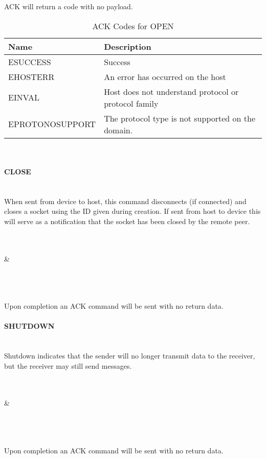 \documentclass[10pt]{article}
\begin{document}
	ACK will return a code with no payload.
	\begin{table}[H]
		\begin{center}
			\caption{ACK Codes for OPEN}
			\label{tab:openErrTable}
			\begin{tabular}{l|l} 
				\rowcolor{lightgray}
				\textbf{Name} & \textbf{Description}\\
				\hline
				ESUCCESS & Success\\
				EHOSTERR & An error has occurred on the host\\
				EINVAL & Host does not understand protocol or protocol family\\
				EPROTONOSUPPORT & The protocol type is not supported on the domain. \\
			\end{tabular}
		\end{center}
	\end{table} \mbox{}\\
	\paragraph{CLOSE} \mbox{}\\
	When sent from device to host, this command disconnects (if connected) and closes a socket using the ID given during creation.
	If sent from host to device this will serve as a notification that the socket has been closed by the remote peer. \\
	\\
	\begin{bytefield}[bitwidth=1.7em]{32}
		 \\
		 &
		 \\
		 \\
		 \\
	\end{bytefield}\\
	Upon completion an ACK command will be sent with no return data. 
	\\
	\paragraph{SHUTDOWN} \mbox{}\\
	Shutdown indicates that the sender will no longer transmit data to the receiver, but the receiver may still send messages.\\
	\\
	\begin{bytefield}[bitwidth=1.7em]{32}
		 \\
		 &
		 \\
		 \\
		 \\
	\end{bytefield}\\
	Upon completion an ACK command will be sent with no return data. 
	\\
\end{document}
